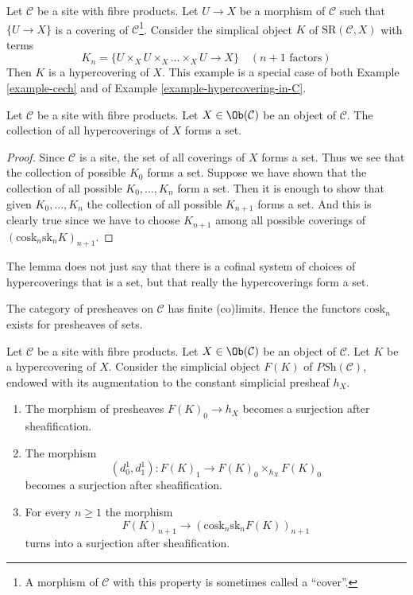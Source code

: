 \begin{example}
\label{example-cech-cover}
Let $\mathcal{C}$ be a site with fibre products. Let $U \to X$ be a
morphism of $\mathcal{C}$ such that $\{U \to X\}$ is a covering of
$\mathcal{C}$\footnote{A morphism of $\mathcal{C}$ with this property
is sometimes called a ``cover''.}. Consider the simplical object $K$ of
$\text{SR}(\mathcal{C}, X)$ with terms
$$
K_n = \{U \times_X U \times_X \ldots \times_X U \to X\}
\quad (n + 1 \text{ factors})
$$
Then $K$ is a hypercovering of $X$. This example is a special case of both
Example \ref{example-cech} and of
Example \ref{example-hypercovering-in-C}.
\end{example}

\begin{lemma}
\label{lemma-hypercoverings-set}
Let $\mathcal{C}$ be a site with fibre products.
Let $X \in \Ob(\mathcal{C})$ be an object of $\mathcal{C}$.
The collection of all hypercoverings of $X$ forms a set.
\end{lemma}

\begin{proof}
Since $\mathcal{C}$ is a site, the set of all coverings of
$X$ forms a set. Thus we see that the collection
of possible $K_0$ forms a set. Suppose we have shown that
the collection of all possible $K_0, \ldots, K_n$ form
a set. Then it is enough to show that given
$K_0, \ldots, K_n$ the collection of all possible
$K_{n + 1}$ forms a set. And this is clearly true since
we have to choose $K_{n + 1}$ among all possible coverings
of $(\text{cosk}_n \text{sk}_n K)_{n + 1}$.
\end{proof}

\begin{remark}
\label{remark-hypercoverings-really-set}
The lemma does not just say that there is a cofinal
system of choices of hypercoverings that is a set,
but that really the hypercoverings form a set.
\end{remark}

\noindent
The category of presheaves on $\mathcal{C}$ has
finite (co)limits. Hence the functors $\text{cosk}_n$
exists for presheaves of sets.

\begin{lemma}
\label{lemma-hypercovering-F}
Let $\mathcal{C}$ be a site with fibre products.
Let $X \in \Ob(\mathcal{C})$ be an object of $\mathcal{C}$.
Let $K$ be a hypercovering of $X$.
Consider the simplicial object $F(K)$ of $\textit{PSh}(\mathcal{C})$,
endowed with its augmentation to the constant simplicial presheaf $h_X$.
\begin{enumerate}
\item The morphism of presheaves $F(K)_0 \to h_X$ becomes
a surjection after sheafification.
\item The morphism
$$
(d^1_0, d^1_1) :
F(K)_1
\longrightarrow
F(K)_0 \times_{h_X} F(K)_0
$$
becomes a surjection after sheafification.
\item For every $n \geq 1$ the morphism
$$
F(K)_{n + 1} \longrightarrow (\text{cosk}_n \text{sk}_n F(K))_{n + 1}
$$
turns into a surjection after sheafification.
\end{enumerate}
\end{lemma}

